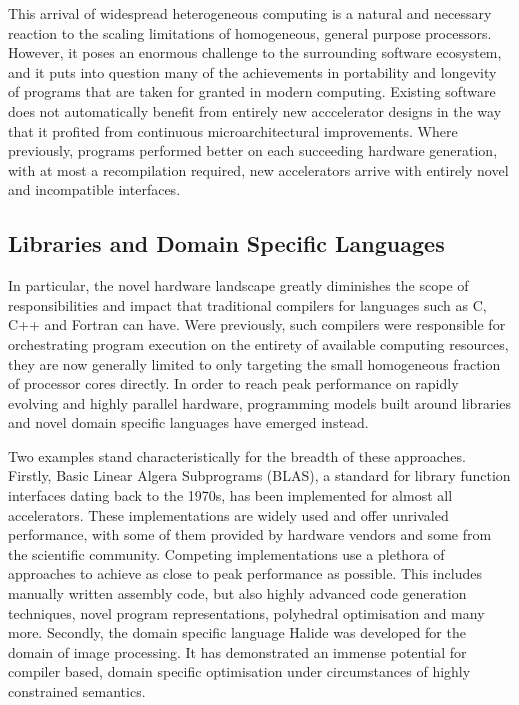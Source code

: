     This arrival of widespread heterogeneous computing is a natural and
    necessary reaction to the scaling limitations of homogeneous, general
    purpose processors.
    However, it poses an enormous challenge to the surrounding software
    ecosystem, and it puts into question many of the achievements in portability
    and longevity of programs that are taken for granted in modern computing.
    Existing software does not automatically benefit from entirely new
    acccelerator designs in the way that it profited from continuous
    microarchitectural improvements.
    Where previously, programs performed better on each succeeding hardware
    generation, with at most a recompilation required, new accelerators arrive
    with entirely novel and incompatible interfaces.

\subsection*{Libraries and Domain Specific Languages}

    In particular, the novel hardware landscape greatly diminishes the
    scope of responsibilities and impact that traditional compilers for
    languages such as C, C++ and Fortran can have.
    Were previously, such compilers were responsible for orchestrating
    program execution on the entirety of available computing resources, they are
    now generally limited to only targeting the small homogeneous fraction of
    processor cores directly.
    In order to reach peak performance on rapidly evolving and highly parallel
    hardware, programming models built around libraries and novel domain
    specific languages have emerged instead.

    Two examples stand characteristically for the breadth of these approaches.
    Firstly, Basic Linear Algera Subprograms (BLAS), a standard for library
    function interfaces dating back to the 1970s, has been implemented for
    almost all accelerators.
    These implementations are widely used and offer unrivaled performance, with
    some of them provided by hardware vendors and some from the scientific
    community.
    Competing implementations use a plethora of approaches to achieve as close
    to peak performance as possible.
    This includes manually written assembly code, but also highly advanced
    code generation techniques, novel program representations, polyhedral
    optimisation and many more.
    Secondly, the domain specific language Halide was developed for the domain
    of image processing.
    It has demonstrated an immense potential for compiler based, domain specific
    optimisation under circumstances of highly constrained semantics.

